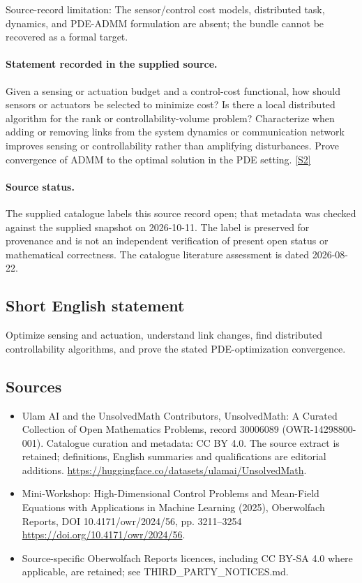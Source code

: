 \documentclass[11pt]{article}
\begin{document}
Source-record limitation: The sensor/control cost models, distributed task, dynamics, and PDE-ADMM formulation are absent; the bundle cannot be recovered as a formal target.
\paragraph{Statement recorded in the supplied source.}
Given a sensing or actuation budget and a control-cost functional, how should sensors or actuators be selected to minimize cost? Is there a local distributed algorithm for the rank or controllability-volume problem? Characterize when adding or removing links from the system dynamics or communication network improves sensing or controllability rather than amplifying disturbances. Prove convergence of ADMM to the optimal solution in the PDE setting. \href{https://doi.org/10.4171/owr/2024/56}{[S2]}
\paragraph{Source status.}
The supplied catalogue labels this source record open; that metadata was checked against the supplied snapshot on 2026-10-11. The label is preserved for provenance and is not an independent verification of present open status or mathematical correctness. The catalogue literature assessment is dated 2026-08-22.
\subsection{Short English statement}
Optimize sensing and actuation, understand link changes, find distributed controllability algorithms, and prove the stated PDE-optimization convergence.
\subsection{Sources}
\begin{itemize}
\item[S1] Ulam AI and the UnsolvedMath Contributors, UnsolvedMath: A Curated Collection of Open Mathematics Problems, record 30006089 (OWR-14298800-001). Catalogue curation and metadata: CC BY 4.0. The source extract is retained; definitions, English summaries and qualifications are editorial additions.
\url{https://huggingface.co/datasets/ulamai/UnsolvedMath}.
\item[S2] Mini-Workshop: High-Dimensional Control Problems and Mean-Field Equations with Applications in Machine Learning (2025), Oberwolfach Reports, DOI 10.4171/owr/2024/56, pp. 3211--3254
\url{https://doi.org/10.4171/owr/2024/56}.
\item Source-specific Oberwolfach Reports licences, including CC BY-SA 4.0 where applicable, are retained; see THIRD\_PARTY\_NOTICES.md.
\end{itemize}
\end{document}
